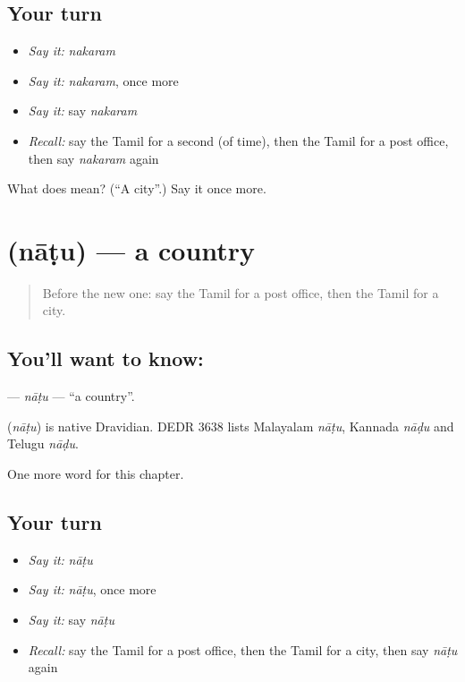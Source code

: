 \subsection*{Your turn}
\begin{itemize}
\raggedright
  \item \emph{Say it:} \emph{nakaram}
  \item \emph{Say it:} \emph{nakaram}, once more
  \item \emph{Say it:} say \emph{nakaram}
  \item \emph{Recall:} say the Tamil for a second (of time), then the Tamil for a post office, then say \emph{nakaram} again
\end{itemize}

\begin{tcolorbox}[breakable,colback=teal!4,colframe=teal!35!black,title={Before you move on}]
What does  mean? (\textquotedblleft{}A city\textquotedblright{}.) Say it once more.
\end{tcolorbox}
\section[\texorpdfstring{\ta{நாடு} (nāṭu)}{நாடு (nāṭu)}]{ (nāṭu) — a country}

\label{lesson:TA-C234-natu}



\begin{quote}
Before the new one: say the Tamil for a post office, then the Tamil for a city.
\end{quote}

\subsection*{You'll want to know: }
\textbf{} — \emph{nāṭu} — \textquotedblleft{}a country\textquotedblright{}.

\begin{cousinweb}
\textbf{} (\emph{nāṭu}) is native Dravidian. DEDR 3638 lists Malayalam \emph{nāṭu}, Kannada \emph{nāḍu} and Telugu \emph{nāḍu}.
\end{cousinweb}

\begin{grammarlens}[title={What you've built}]
One more word for this chapter.
\end{grammarlens}

\subsection*{Your turn}
\begin{itemize}
\raggedright
  \item \emph{Say it:} \emph{nāṭu}
  \item \emph{Say it:} \emph{nāṭu}, once more
  \item \emph{Say it:} say \emph{nāṭu}
  \item \emph{Recall:} say the Tamil for a post office, then the Tamil for a city, then say \emph{nāṭu} again
\end{itemize}

